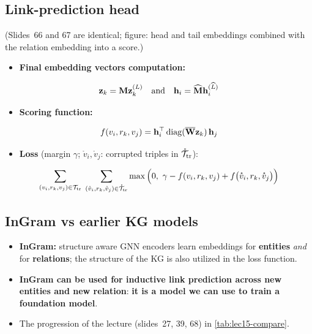 \subsection{Link-prediction head}\label{sec:lec15-head}

(Slides~66 and 67 are identical; figure: head and tail embeddings combined with the
relation embedding into a score.)
\begin{itemize}
  \item \textbf{Final embedding vectors computation:}
\end{itemize}
\begin{equation}\label{eq:lec15-final}
  \mathbf{z}_k = \mathbf{M}\mathbf{z}_k^{(L)} \quad\text{and}\quad \mathbf{h}_i = \widehat{\mathbf{M}}\mathbf{h}_i^{(\widehat{L})}
\end{equation}
\begin{itemize}
  \item \textbf{Scoring function:}
\end{itemize}
\begin{equation}\label{eq:lec15-score}
  f(v_i,r_k,v_j) = \mathbf{h}_i^{\top}\operatorname{diag}(\overline{\mathbf{W}}\mathbf{z}_k)\,\mathbf{h}_j
\end{equation}
\begin{itemize}
  \item \textbf{Loss} (margin $\gamma$; $\mathring{v}_i,\mathring{v}_j$: corrupted
    triples in $\mathring{\mathcal{T}}_{\mathrm{tr}}$):
\end{itemize}
\begin{equation}\label{eq:lec15-loss}
  \sum_{(v_i,r_k,v_j)\in\mathcal{T}_{\mathrm{tr}}}\;
  \sum_{(\mathring{v}_i,r_k,\mathring{v}_j)\in\mathring{\mathcal{T}}_{\mathrm{tr}}}
  \max\Big(0,\ \gamma - f(v_i,r_k,v_j) + f\big(\mathring{v}_i,r_k,\mathring{v}_j\big)\Big)
\end{equation}

\subsection{InGram vs earlier KG models}\label{sec:lec15-compare}

\begin{itemize}
  \item \textbf{InGram:} structure aware GNN encoders learn embeddings for
    \textbf{entities} \emph{and} for \textbf{relations}; the structure of the KG is also
    utilized in the loss function.
  \item \textbf{InGram can be used for inductive link prediction across new entities
    and new relation}: \textbf{it is a model we can use to train a foundation model}.
  \item The progression of the lecture (slides~27, 39, 68) in \cref{tab:lec15-compare}.
\end{itemize}

